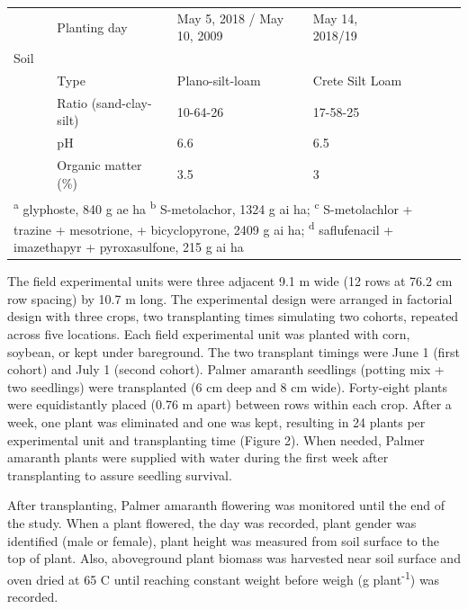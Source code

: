 \documentclass[utf8]{frontiersSCNS}
\begin{document}
\begin{table}[!h]
{\begin{tabular}[t]{lllllll}
\multirow{-6}{*}{\raggedright\arraybackslash } & Planting day & May 5, 2018 / May 10, 2009 & May 14, 2018/19 &  &  & \\

Soil &  &  &  &  &  & \\

 & Type & Plano-silt-loam & Crete Silt Loam &  &  & \\

 & Ratio (sand-clay-silt) & 10-64-26 & 17-58-25 &  &  & \\

 & pH & 6.6 & 6.5 &  &  & \\

\multirow{-4}{*}{\raggedright\arraybackslash } & Organic matter (\%) & 3.5 & 3 &  &  & \\
\bottomrule
\multicolumn{7}{l}{\rule{0pt}{1em}\textsuperscript{a} glyphoste, 840 g ae ha \textsuperscript{b} S-metolachor, 1324 g ai ha; \textsuperscript{c} S-metolachlor + trazine + mesotrione, + bicyclopyrone, 2409 g ai ha; \textsuperscript{d} saflufenacil + imazethapyr + pyroxasulfone, 215 g ai ha}\\
\end{tabular}}
\end{table}

The field experimental units were three adjacent 9.1 m wide (12 rows at
76.2 cm row spacing) by 10.7 m long. The experimental design were
arranged in factorial design with three crops, two transplanting times
simulating two cohorts, repeated across five locations. Each field
experimental unit was planted with corn, soybean, or kept under
bareground. The two transplant timings were June 1 (first cohort) and
July 1 (second cohort). Palmer amaranth seedlings (potting mix + two
seedlings) were transplanted (6 cm deep and 8 cm wide). Forty-eight
plants were equidistantly placed (0.76 m apart) between rows within each
crop. After a week, one plant was eliminated and one was kept, resulting
in 24 plants per experimental unit and transplanting time (Figure 2).
When needed, Palmer amaranth plants were supplied with water during the
first week after transplanting to assure seedling survival.

After transplanting, Palmer amaranth flowering was monitored until the
end of the study. When a plant flowered, the day was recorded, plant
gender was identified (male or female), plant height was measured from
soil surface to the top of plant. Also, aboveground plant biomass was
harvested near soil surface and oven dried at 65 C until reaching
constant weight before weigh (g plant\textsuperscript{-1}) was recorded.
\end{document}

